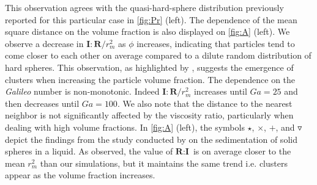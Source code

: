 This observation agrees with the quasi-hard-sphere distribution previously reported for this particular case in \ref{fig:Pr} (left).
The dependence of the mean square distance on the volume fraction is also displayed on \ref{fig:A} (left). 
We observe a decrease in $\textbf{I}:\textbf{R}/r_m^2$ as $\phi$ increases, indicating that particles tend to come closer to each other on average compared to a dilute random distribution of hard spheres. 
This observation, as highlighted by \citet{zhang2023evolution}, suggests the emergence of clusters when increasing the particle volume fraction. 
The dependence on the \textit{Galileo} number is non-monotonic. 
Indeed $\textbf{I}:\textbf{R}/r_m^2$ increases until $Ga = 25$ and then decreases until $Ga = 100$. We also note that the distance to the nearest neighbor is not significantly affected by the viscosity ratio, particularly when dealing with high volume fractions. 
In \ref{fig:A} (left), the symbols $\pmb\star$, $\pmb\times$, $\pmb +$, and $\pmb\triangledown$ depict the findings from the study conducted by \citet{zhang2023evolution} on the sedimentation of solid spheres in a liquid.
As observed, the value of $\textbf{R}:\textbf{I}$ is on average closer to the mean $r_m^2$ than our simulations, but it maintains the same trend i.e. clusters appear as the volume fraction increases.

